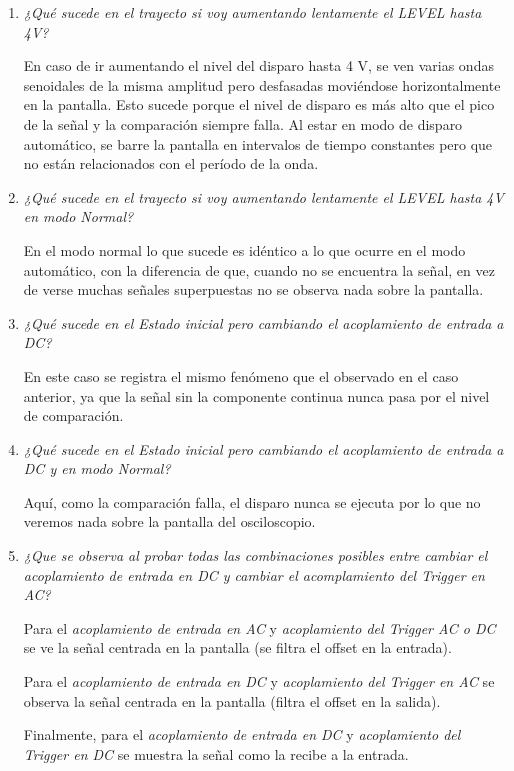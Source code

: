 \documentclass{article}
\begin{document}
\begin{enumerate}

	\item \noindent \textit{¿Qué sucede en el trayecto si voy aumentando lentamente el LEVEL hasta 4V?}
	\smallskip

	En caso de ir aumentando el nivel del disparo hasta 4 V, se ven varias ondas senoidales de la misma amplitud pero desfasadas moviéndose horizontalmente en la pantalla. Esto sucede porque el nivel de disparo es más alto que el pico de la señal y la comparación siempre falla. Al estar en modo de disparo automático, se barre la pantalla en intervalos de tiempo constantes pero que no están relacionados con el período de la onda.
	\bigskip


	\item \noindent \textit{¿Qué sucede en el trayecto si voy aumentando lentamente el LEVEL hasta 4V en modo Normal?}
	\smallskip

	En el modo normal lo que sucede es idéntico a lo que ocurre en el modo automático, con la diferencia de que, cuando no se encuentra la señal, en vez de verse muchas señales superpuestas no se observa nada sobre la pantalla.
	\bigskip


	\item \noindent \textit{¿Qué sucede en el Estado inicial pero cambiando el acoplamiento de entrada a DC?}
	\smallskip

	En este caso se registra el mismo fenómeno que el observado en el caso anterior, ya que la señal sin la componente continua nunca pasa por el nivel de comparación.
	\bigskip


	\item \noindent \textit{¿Qué sucede en el Estado inicial pero cambiando el acoplamiento de entrada a DC y en modo Normal?}
	\smallskip

	Aquí, como la comparación falla, el disparo nunca se ejecuta por lo que no veremos nada sobre la pantalla del osciloscopio.
	\bigskip


	\item \noindent \textit{¿Que se observa al probar todas las combinaciones posibles entre cambiar el acoplamiento de entrada en DC y cambiar el acomplamiento del Trigger en AC?}
	\smallskip

	Para el \textit{acoplamiento de entrada en AC} y \textit{acoplamiento del Trigger AC o DC} se ve la señal centrada en la pantalla (se filtra el offset en la entrada).
	\par
	Para el \textit{acoplamiento de entrada en DC} y \textit{acoplamiento del Trigger en AC} se observa la señal centrada en la pantalla (filtra el offset en la salida).
	\par
Finalmente, para el \textit{acoplamiento de entrada en DC} y \textit{acoplamiento del Trigger en DC} se muestra la señal como la recibe a la entrada.
	\bigskip
	


\end{enumerate}
\end{document}
